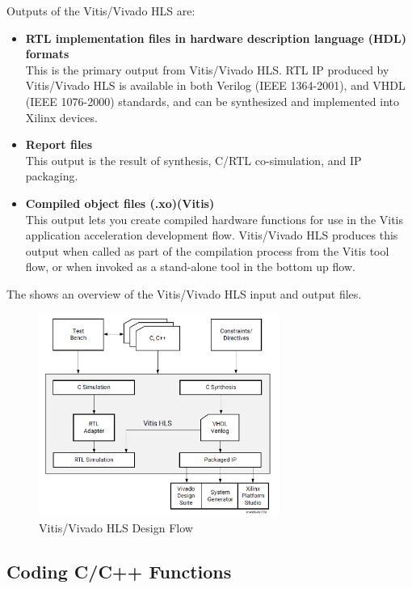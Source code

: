 Outputs of the Vitis/Vivado HLS are:
\begin{itemize}
  \item \textbf{RTL implementation files in hardware description language (HDL) formats}\\ This is the primary output from Vitis/Vivado HLS. RTL IP produced by Vitis/Vivado HLS is available in both Verilog (IEEE 1364-2001), and VHDL (IEEE 1076-2000) standards, and can be synthesized and implemented into Xilinx devices.
  \item \textbf{Report files}\\ This output is the result of synthesis, C/RTL co-simulation, and IP packaging.
  \item \textbf{Compiled object files (.xo)(Vitis)}\\ This output lets you create compiled hardware functions for use in the Vitis application acceleration development flow. Vitis/Vivado HLS produces this output when called as part of the compilation process from the Vitis tool flow, or when invoked as a stand-alone tool in the bottom up flow.
\end{itemize}

The  shows an overview of the Vitis/Vivado HLS input and output files.
\begin{figure}[H]
  \begin{center}
      \includegraphics[width=0.7\textwidth]{images/VitisFlow.png}
      \caption{Vitis/Vivado HLS Design Flow}
      \label{VitisFlow}
  \end{center}
\end{figure}

\subsection{Coding C/C++ Functions}
